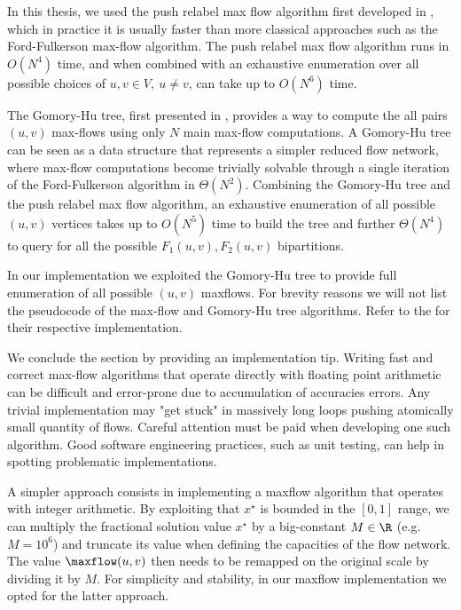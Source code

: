 \medskip

In this thesis,
we used the push relabel max flow algorithm first developed in \cite{goldberg1997},
which in practice it is usually faster than more classical approaches such as the Ford-Fulkerson max-flow algorithm.
The push relabel max flow algorithm runs in $O(N^4)$ time,
and when combined with an exhaustive enumeration over all possible choices of $u, v \in V,\ u \ne v$,
can take up to $O(N^6)$ time.

The Gomory-Hu tree, first presented in \cite{gomory1961},
provides a way to compute the all pairs $(u, v)$ max-flows using only $N$ main max-flow computations.
A Gomory-Hu tree can be seen as a data structure that represents a simpler reduced flow network,
where max-flow computations become trivially solvable
through a single iteration of the Ford-Fulkerson algorithm in $\Theta(N^2)$.
Combining the Gomory-Hu tree and the push relabel max flow algorithm,
an exhaustive enumeration of all possible $(u, v)$ vertices takes up to $O(N^5)$ time to build the tree
and further $\Theta(N^4)$ to query for all the possible $F_1(u, v), F_2(u, v)$ bipartitions.

In our implementation
we exploited the Gomory-Hu tree to provide full enumeration of all possible $(u, v)$ maxflows.
For brevity reasons we will not list the pseudocode of the max-flow and Gomory-Hu tree algorithms.
Refer to the  for their respective implementation.

\medskip

We conclude the section by providing an implementation tip.
Writing fast and correct max-flow algorithms that operate directly with floating point arithmetic
can be difficult and error-prone due to accumulation of accuracies errors.
Any trivial implementation may "get stuck" in massively long loops pushing atomically small quantity of flows.
Careful attention must be paid when developing one such algorithm.
Good software engineering practices, such as unit testing, can help in spotting problematic implementations.

A simpler approach consists in implementing a maxflow algorithm that operates with integer arithmetic.
By exploiting that $x^\star$ is bounded in the $[0, 1]$ range,
we can multiply the fractional solution value $x^\star$ by a big-constant $M \in \R$ (e.g. $M = 10^6$)
and truncate its value when defining the capacities of the flow network.
The value $\maxflow(u, v)$ then needs to be remapped on the original scale
by dividing it by $M$.
For simplicity and stability, in our maxflow implementation we opted for the latter approach.

